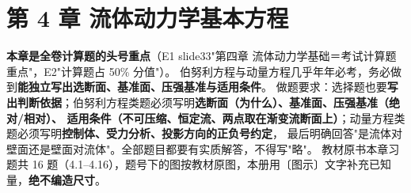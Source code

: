 \chapter*{第 4 章 流体动力学基本方程}

\begin{tishi}
\textbf{本章是全卷计算题的头号重点}（E1 slide33"第四章 流体动力学基础＝考试计算题重点"，E2"计算题占 50\% 分值"）。
伯努利方程与动量方程几乎年年必考，务必做到\textbf{能独立写出选断面、基准面、压强基准与适用条件}。
做题要求：选择题也要\textbf{写出判断依据}；伯努利方程类题必须写明\textbf{选断面（为什么）、基准面、压强基准（绝对/相对）、
适用条件（不可压缩、恒定流、两点取在渐变流断面上）}；动量方程类题必须写明\textbf{控制体、受力分析、投影方向的正负号约定}，
最后明确回答"是流体对壁面还是壁面对流体"。全部题目都要有实质解答，不得写"略"。
教材原书本章习题共 16 题（4.1--4.16），题号下的图按教材原图，本册用〔图示〕文字补充已知量，\textbf{绝不编造尺寸}。
\end{tishi}

